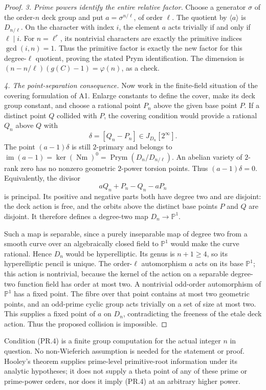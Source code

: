 \begin{proof}
\emph{3. Prime powers identify the entire relative factor.}
Choose a generator $\sigma$ of the order-$n$ deck group and put
$a=\sigma^{n/\ell}$, of order $\ell$.
The quotient by $\langle a\rangle$ is $D_{n/\ell}$.
On the character with index $i$, the element $a$ acts trivially
if and only if $\ell\mid i$. For $n=\ell^r$, its nontrivial
characters are exactly the primitive indices $\gcd(i,n)=1$.
Thus the primitive factor is exactly the new factor for this
degree-$\ell$ quotient, proving the stated Prym identification.
The dimension is $(n-n/\ell)(g(C)-1)=\varphi(n)$, as a check.

\emph{4. The point-separation consequence.}
Now work in the finite-field situation of the covering formulation
of A1. Enlarge constants to define the cover, make its deck group
constant, and choose a rational point $P_n$ above the given base
point $P$. If a distinct point $Q$ collided with $P$, the covering
condition would provide a rational $Q_n$ above $Q$ with
\[
 \delta=[Q_n-P_n]\in J_{D_n}[2^\infty].
\]
The point $(a-1)\delta$ is still $2$-primary and belongs to
$\operatorname{im}(a-1)=\ker(\operatorname{Nm})^0
=\operatorname{Prym}(D_n/D_{n/\ell})$.
An abelian variety of $2$-rank zero has no nonzero geometric
$2$-power torsion points. Thus $(a-1)\delta=0$.
Equivalently, the divisor
\[
 aQ_n+P_n-Q_n-aP_n
 \tag{PR.8}
\]
is principal. Its positive and negative parts both have degree two
and are disjoint: the deck action is free, and the orbits above
the distinct base points $P$ and $Q$ are disjoint. It therefore
defines a degree-two map $D_n\to\mathbb P^1$.

Such a map is separable, since a purely inseparable map of degree
two from a smooth curve over an algebraically closed field to
$\mathbb P^1$ would make the curve rational. Hence $D_n$ would be
hyperelliptic. Its genus is $n+1\ge4$, so its hyperelliptic pencil
is unique. The order-$\ell$ automorphism $a$ acts on its base
$\mathbb P^1$; this action is nontrivial, because the kernel of
the action on a separable degree-two function field has order
at most two. A nontrivial odd-order automorphism of $\mathbb P^1$
has a fixed point. The fibre over that point contains at most two
geometric points, and an odd-prime cyclic group acts trivially on
a set of size at most two. This supplies a fixed point of $a$ on
$D_n$, contradicting the freeness of the etale deck action.
Thus the proposed collision is impossible.
\end{proof}

Condition (PR.4) is a finite group computation for the actual integer
$n$ in question. No non-Wieferich assumption is needed for the
statement or proof. Hooley's theorem supplies prime-level
primitive-root information under its analytic hypotheses; it does
not supply a theta point of any of these prime or prime-power
orders, nor does it imply (PR.4) at an arbitrary higher power.

